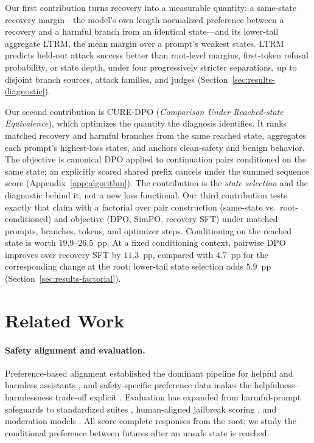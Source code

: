 \documentclass[11pt]{article}
\newcommand{\method}{CURE-DPO}
\newcommand{\ltrm}{LTRM}
\begin{document}
Our first contribution turns recovery into a measurable quantity: a same-state
recovery margin---the model's own length-normalized preference between a recovery
and a harmful branch from an identical state---and its lower-tail aggregate
\ltrm{}, the mean margin over a prompt's weakest states. \ltrm{} predicts
held-out attack success better than root-level margins, first-token refusal
probability, or state depth, under four progressively stricter separations, up to
disjoint branch sources, attack families, and judges
(Section~\ref{sec:results-diagnostic}).

Our second contribution is \method{} (\emph{Comparison Under Reached-state
Equivalence}), which optimizes the quantity the diagnosis identifies. It ranks
matched recovery and harmful branches from the same reached state, aggregates
each prompt's highest-loss states, and anchors clean-safety and benign
behavior. The objective is canonical DPO applied to continuation pairs
conditioned on the same state; an explicitly scored shared prefix cancels under
the summed sequence score (Appendix~\ref{app:algorithm}). The
contribution is the \emph{state selection} and the diagnostic behind it, not
a new loss functional. Our third contribution tests exactly that claim with a
factorial over pair construction (same-state vs.\ root-conditioned) and
objective (DPO, SimPO, recovery SFT) under matched prompts, branches, tokens,
and optimizer steps. Conditioning on the reached state is worth
\(19.9\)--\(26.5\)~pp. At a fixed conditioning context, pairwise DPO improves
over recovery SFT by \(11.3\)~pp, compared with \(4.7\)~pp for the corresponding
change at the root; lower-tail state selection adds \(5.9\)~pp
(Section~\ref{sec:results-factorial}).


\section{Related Work}
\label{sec:related-work}

\paragraph{Safety alignment and evaluation.}
Preference-based alignment established the dominant pipeline for helpful and
harmless assistants \citep{ouyang2022instructgpt,bai2022constitutional}, and
safety-specific preference data makes the helpfulness--harmlessness trade-off
explicit \citep{ji2023beavertails,dai2023saferlhf}. Evaluation has expanded from
harmful-prompt safeguards \citep{wang2024donotanswer} to standardized suites
\citep{mazeika2024harmbench,chao2024jailbreakbench}, human-aligned jailbreak
scoring \citep{souly2024strongreject}, and moderation models
\citep{han2024wildguard}. All score complete responses from the root; we study
the conditional preference between futures after an unsafe state is reached.
\end{document}
